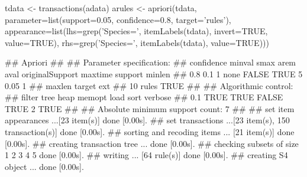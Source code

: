 \begin{Schunk}
% --begin: "casestudy-assoc-arules-search"
\begin{Sinput}
tdata <- transactions(adata)
arules <- apriori(tdata, 
                  parameter=list(support=0.05,
                                 confidence=0.8,
                                 target='rules'),
                  appearance=list(lhs=grep('Species=', itemLabels(tdata), invert=TRUE, value=TRUE),
                                  rhs=grep('Species=', itemLabels(tdata), value=TRUE)))
\end{Sinput}
\begin{Soutput}
## Apriori
## 
## Parameter specification:
##  confidence minval smax arem  aval originalSupport maxtime support minlen
##         0.8    0.1    1 none FALSE            TRUE       5    0.05      1
##  maxlen target  ext
##      10  rules TRUE
## 
## Algorithmic control:
##  filter tree heap memopt load sort verbose
##     0.1 TRUE TRUE  FALSE TRUE    2    TRUE
## 
## Absolute minimum support count: 7 
## 
## set item appearances ...[23 item(s)] done [0.00s].
## set transactions ...[23 item(s), 150 transaction(s)] done [0.00s].
## sorting and recoding items ... [21 item(s)] done [0.00s].
## creating transaction tree ... done [0.00s].
## checking subsets of size 1 2 3 4 5 done [0.00s].
## writing ... [64 rule(s)] done [0.00s].
## creating S4 object  ... done [0.00s].
\end{Soutput}
%
% --end: "casestudy-assoc-arules-search"
\end{Schunk}
